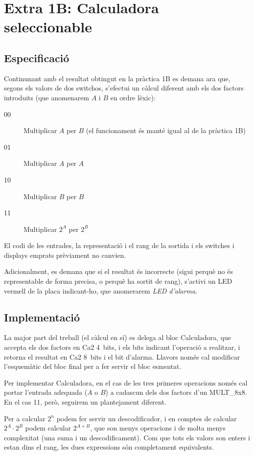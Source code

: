 \chapter{Extra 1B: Calculadora seleccionable}

\section{Especificació}

Continunant amb el resultat obtingut en la pràctica 1B es demana ara que, segons
els valors de dos switchos, s'efectui un càlcul diferent amb els dos factors
introduits (que anomenarem $A$ i $B$ en ordre lèxic):

\begin{description}
\item[00] Multiplicar $A$ per $B$ (el funcionament és manté igual al de la pràctica 1B)
\item[01] Multiplicar $A$ per $A$
\item[10] Multiplicar $B$ per $B$
\item[11] Multiplicar $2^A$ per $2^B$
\end{description}

El codi de les entrades, la representació i el rang de la sortida i els switches
i displays emprats prèviament no canvien.

Adicionalment, es demana que si el resultat és incorrecte (sigui perquè no és
representable de forma precisa, o perquè ha sortit de rang), s'activi un LED vermell
de la placa indicant-ho, que anomerarem \emph{LED d'alarma}.

\section{Implementació}

La major part del treball (el càlcul en sí) es delega al bloc \textsf{Calculadora},
que accepta els dos factors en Ca2 4~bits, i els bits indicant l'operació a realitzar, i retorna el resultat en Ca2 8~bits i el bit d'alarma. Llavors només cal modificar l'esquemàtic del bloc final per a fer servir el bloc esmentat.

Per implementar \textsf{Calculadora}, en el cas de les tres primeres operacions
només cal portar l'entrada adequada ($A$ o $B$) a cadascun dels dos factors d'un
\textsf{MULT\_8x8}. En el cas 11, però, seguirem un plantejament diferent.

Per a calcular $2^n$ podem fer servir un descodificador, i en comptes de calcular
$2^A \cdot 2^B$ podem calcular $2^{A+B}$, que son menys operacions i de molta menys
complexitat (una suma i un descodificament). Com que tots els valors son enters i estan dins
el rang, les dues expressions són completament equivalents.

